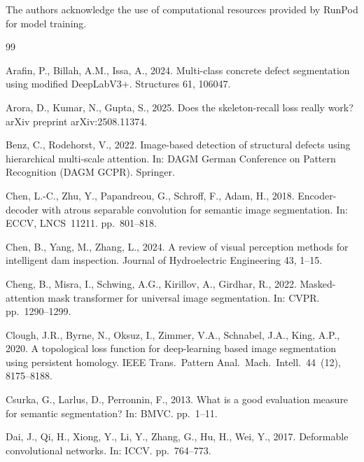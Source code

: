 \documentclass[review,authoryear]{elsarticle}
\begin{document}
The authors acknowledge the use of computational resources provided by RunPod for model training.



\begin{thebibliography}{99}

Arafin, P., Billah, A.M., Issa, A., 2024.
\newblock Multi-class concrete defect segmentation using modified DeepLabV3+.
\newblock Structures 61, 106047.

Arora, D., Kumar, N., Gupta, S., 2025.
\newblock Does the skeleton-recall loss really work?
\newblock arXiv preprint arXiv:2508.11374.

Benz, C., Rodehorst, V., 2022.
\newblock Image-based detection of structural defects using hierarchical multi-scale attention.
\newblock In: DAGM German Conference on Pattern Recognition (DAGM GCPR). Springer.

Chen, L.-C., Zhu, Y., Papandreou, G., Schroff, F., Adam, H., 2018.
\newblock Encoder-decoder with atrous separable convolution for semantic image segmentation.
\newblock In: ECCV, LNCS~11211. pp.~801--818.

Chen, B., Yang, M., Zhang, L., 2024.
\newblock A review of visual perception methods for intelligent dam inspection.
\newblock Journal of Hydroelectric Engineering 43, 1--15.

Cheng, B., Misra, I., Schwing, A.G., Kirillov, A., Girdhar, R., 2022.
\newblock Masked-attention mask transformer for universal image segmentation.
\newblock In: CVPR. pp.~1290--1299.

Clough, J.R., Byrne, N., Oksuz, I., Zimmer, V.A., Schnabel, J.A., King, A.P., 2020.
\newblock A topological loss function for deep-learning based image segmentation using persistent homology.
\newblock IEEE Trans.\ Pattern Anal.\ Mach.\ Intell.\ 44~(12), 8175--8188.

Csurka, G., Larlus, D., Perronnin, F., 2013.
\newblock What is a good evaluation measure for semantic segmentation?
\newblock In: BMVC. pp.~1--11.

Dai, J., Qi, H., Xiong, Y., Li, Y., Zhang, G., Hu, H., Wei, Y., 2017.
\newblock Deformable convolutional networks.
\newblock In: ICCV. pp.~764--773.


\end{thebibliography}
\end{document}
